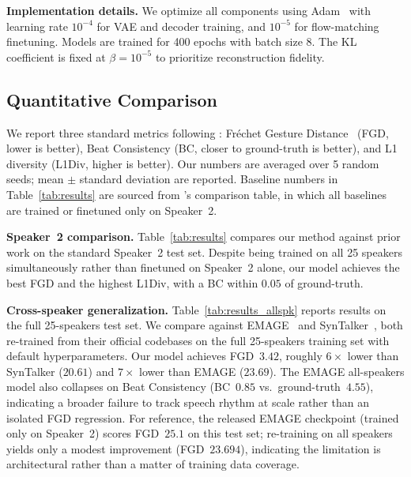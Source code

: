 \noindent \textbf{Implementation details.}
We optimize all components using Adam~\cite{adam2015} with learning rate $10^{-4}$ for VAE and decoder training, and $10^{-5}$ for flow-matching finetuning.
Models are trained for 400 epochs with batch size 8.
The KL coefficient is fixed at $\beta = 10^{-5}$ to prioritize reconstruction fidelity.

\subsection{Quantitative Comparison}
We report three standard metrics following \citet{emage2024}: Fr\'echet Gesture Distance~\cite{trimodal} (FGD, lower is better), Beat Consistency (BC, closer to ground-truth is better), and L1 diversity (L1Div, higher is better).
Our numbers are averaged over 5 random seeds; mean $\pm$ standard deviation are reported.
Baseline numbers in Table~\ref{tab:results} are sourced from \citet{syntalker}'s comparison table, in which all baselines are trained or finetuned only on Speaker~2.

\noindent \textbf{Speaker~2 comparison.}
Table~\ref{tab:results} compares our method against prior work on the
standard Speaker~2 test set.
Despite being trained on all 25 speakers simultaneously rather than finetuned on Speaker~2 alone, our model achieves the best FGD and the highest L1Div, with a BC within $0.05$ of ground-truth.

\noindent \textbf{Cross-speaker generalization.}
Table~\ref{tab:results_allspk} reports results on the full 25-speakers
test set.
We compare against EMAGE~\cite{emage2024} and SynTalker~\cite{syntalker}, both re-trained from their official codebases on the full 25-speakers training set with default hyperparameters.
Our model achieves FGD~$3.42$, roughly $6{\times}$ lower than SynTalker ($20.61$) and $7{\times}$ lower than EMAGE ($23.69$).
The EMAGE all-speakers model also collapses on Beat Consistency (BC~$0.85$ vs.\ ground-truth~$4.55$), indicating a broader failure to track speech rhythm at scale rather than an isolated FGD regression.
For reference, the released EMAGE checkpoint (trained only on Speaker~2) scores FGD~$25.1$ on this test set; re-training on all speakers yields only a modest improvement (FGD~$23.694$), indicating the limitation is architectural rather than a matter of training data coverage.

